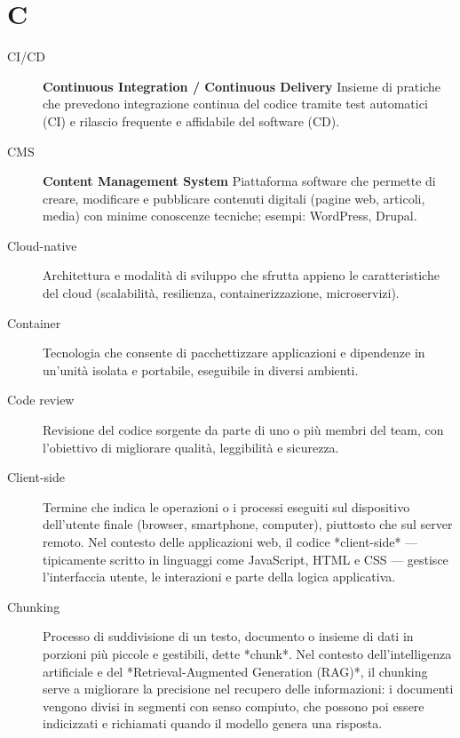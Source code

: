\section*{C}
\begin{description}
    \item[CI/CD] \textbf{Continuous Integration / Continuous Delivery} Insieme di pratiche che prevedono integrazione continua del codice tramite test automatici (CI) e rilascio frequente e affidabile del software (CD).
    \item[CMS] \textbf{Content Management System} Piattaforma software che permette di creare, modificare e pubblicare contenuti digitali (pagine web, articoli, media) con minime conoscenze tecniche; esempi: WordPress, Drupal.
    \item[Cloud-native] Architettura e modalità di sviluppo che sfrutta appieno le caratteristiche del cloud (scalabilità, resilienza, containerizzazione, microservizi).
    \item[Container] Tecnologia che consente di pacchettizzare applicazioni e dipendenze in un'unità isolata e portabile, eseguibile in diversi ambienti.
    \item[Code review] Revisione del codice sorgente da parte di uno o più membri del team, con l’obiettivo di migliorare qualità, leggibilità e sicurezza.
    \item[Client-side] Termine che indica le operazioni o i processi eseguiti sul dispositivo dell’utente finale (browser, smartphone, computer), piuttosto che sul server remoto.  
    Nel contesto delle applicazioni web, il codice *client-side* — tipicamente scritto in linguaggi come JavaScript, HTML e CSS — gestisce l’interfaccia utente, le interazioni e parte della logica applicativa.  
    \item[Chunking] Processo di suddivisione di un testo, documento o insieme di dati in porzioni più piccole e gestibili, dette *chunk*.  
    Nel contesto dell’intelligenza artificiale e del *Retrieval-Augmented Generation (RAG)*, il chunking serve a migliorare la precisione nel recupero delle informazioni: i documenti vengono divisi in segmenti con senso compiuto, che possono poi essere indicizzati e richiamati quando il modello genera una risposta.  
\end{description}

